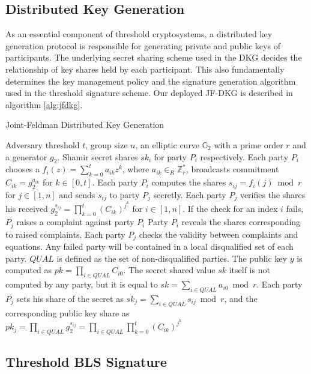 \documentclass[11pt]{article}
\begin{document}
\subsection{Distributed Key Generation}

As an essential component of threshold cryptosystems, a distributed key generation protocol is responsible for generating private and public keys of participants. The underlying secret sharing scheme used in the DKG decides the relationship of key shares held by each participant. This also fundamentally determines the key management policy and the signature generation algorithm used in the threshold signature scheme. Our deployed JF-DKG is described in algorithm \ref{alg:jfdkg}.

\begin{algorithm}
\caption{Joint-Feldman Distributed Key Generation \cite{gennaro2007secure}}\label{alg:jfdkg}
\begin{algorithmic}[1]
\Require Adversary threshold $t$, group size $n$, an elliptic curve $\mathbb{G}_2$ with a prime order $r$ and a generator $g_2$.
\Ensure Shamir secret shares $sk_i$ for party $P_i$ respectively.
\State Each party $P_i$ chooses a $f_i(z) = \sum_{k=0}^t a_{ik}z^{k}$, where $a_{ik} \in_R \mathbb{Z}_r^*$, broadcasts commitment $C_{ik} = g_2^{a_{ik}}$ for $k \in [0,t]$. Each party $P_i$ computes the shares $s_{ij} = f_i(j) \bmod r$ for $j \in [1,n]$ and sends $s_{ij}$ to party $P_j$ secretly.
\State Each party $P_j$ verifies the shares his received $g_2^{s_{ij}} = \prod_{k=0}^t(C_{ik})^{j^k}$ for $i \in [1,n]$. If the check for an index $i$ fails, $P_j$ raises a complaint against party $P_i$
\State Party $P_i$ reveals the shares corresponding to raised complaints. Each party $P_j$ checks the validity between complaints and equations. Any failed party will be contained in a local disqualified set of each party. $QUAL$ is defined as the set of non-disqualified parties.
\State The public key $y$ is computed as $pk = \prod_{i\in QUAL} C_{i0}$. The secret shared value $sk$ itself is not computed by any party, but it is equal to $sk = \sum_{i \in QUAL} a_{i0} \bmod r$. Each party $P_j$ sets his share of the secret as $sk_j = \sum_{i\in QUAL} s_{ij} \bmod r$, and the corresponding public key share as $pk_j = \prod_{i \in QUAL} g_2^{s_{ij}} = \prod_{i \in QUAL} \prod_{k=0}^t (C_{ik})^{j^k}$
\end{algorithmic}
\end{algorithm}

\subsection{Threshold BLS Signature}
\end{document}
